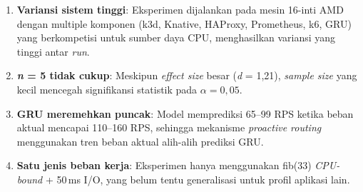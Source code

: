 \begin{enumerate}
    \item \textbf{Variansi sistem tinggi}: Eksperimen dijalankan pada mesin 16-inti AMD dengan multiple komponen (k3d, Knative, HAProxy, Prometheus, k6, GRU) yang berkompetisi untuk sumber daya CPU, menghasilkan variansi yang tinggi antar \emph{run}.
    \item \textbf{\emph{n} = 5 tidak cukup}: Meskipun \emph{effect size} besar (\emph{d} = 1,21), \emph{sample size} yang kecil mencegah signifikansi statistik pada $\alpha = 0,05$.
    \item \textbf{GRU meremehkan puncak}: Model memprediksi 65--99 RPS ketika beban aktual mencapai 110--160 RPS, sehingga mekanisme \emph{proactive routing} menggunakan tren beban aktual alih-alih prediksi GRU.
    \item \textbf{Satu jenis beban kerja}: Eksperimen hanya menggunakan fib(33) \emph{CPU-bound} + 50\,ms I/O, yang belum tentu generalisasi untuk profil aplikasi lain.
\end{enumerate}
